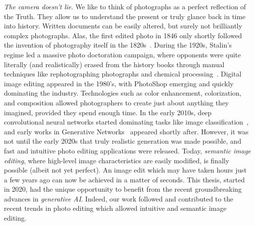 \emph{The camera doesn't lie}. We like to think of photographs as a perfect 
reflection of the Truth. They allow us to understand the present or truly 
glance back in time into history. 
Written documents can be easily altered, but surely not brilliantly complex photographs. 
Alas, the first edited photo in 1846 only shortly followed 
 the invention of photography itself in the 1820s~\citep{imageediting}. 
 During the 1920s, Stalin's regime led a massive photo 
 doctoration campaign, where 
opponents were quite literally (and realistically) erased from the history
 books 
through manual techniques like 
rephotographing photographs and chemical processing~\citep{stalin}. Digital 
image 
editing appeared in the 1980's, with PhotoShop emerging and quickly dominating 
the industry. Technologies such as color enhancement, colorization, and composition 
allowed photographers to create just about anything they imagined, provided they 
spend enough time. 
In the early 2010s, deep convolutional neural networks started dominating tasks like image classification~\citep{krizhevsky2012alexnet},
and early works in Generative Networks~\citep{Kingma2014, goodfellowgans} appeared shortly after. However, it was not until 
the early 2020s that truly realistic generation was made possible, and fast and intuitive 
photo editing applications were released. Today, \emph{semantic image editing}, 
where high-level image characteristics are easily modified, is finally possible (albeit not 
yet perfect). An 
image edit which may have taken hours just a few years ago can now be achieved in a matter of seconds. 
This thesis, started in 2020, had the unique opportunity to benefit from 
the recent groundbreaking advances in \emph{generative AI}. Indeed, our work
 followed and contributed to the recent trends in 
photo editing which allowed intuitive and semantic image editing. 




